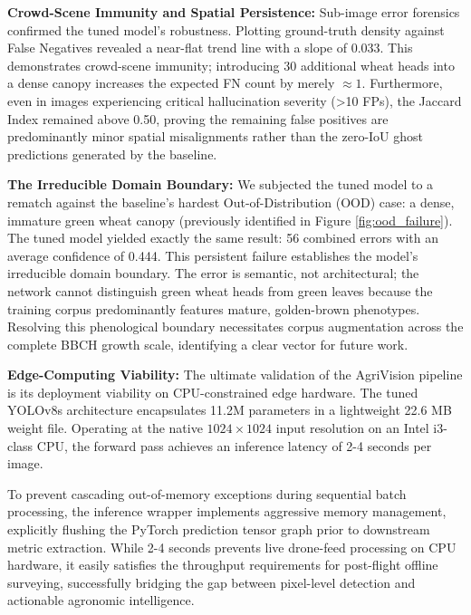 \textbf{Crowd-Scene Immunity and Spatial Persistence:} 
Sub-image error forensics confirmed the tuned model's robustness. Plotting ground-truth density against False Negatives revealed a near-flat trend line with a slope of 0.033. This demonstrates crowd-scene immunity; introducing 30 additional wheat heads into a dense canopy increases the expected FN count by merely $\approx 1$. Furthermore, even in images experiencing critical hallucination severity (>10 FPs), the Jaccard Index remained above 0.50, proving the remaining false positives are predominantly minor spatial misalignments rather than the zero-IoU ghost predictions generated by the baseline. 

\textbf{The Irreducible Domain Boundary:} 
We subjected the tuned model to a rematch against the baseline's hardest Out-of-Distribution (OOD) case: a dense, immature green wheat canopy (previously identified in Figure \ref{fig:ood_failure}). The tuned model yielded exactly the same result: 56 combined errors with an average confidence of 0.444. This persistent failure establishes the model's irreducible domain boundary. The error is semantic, not architectural; the network cannot distinguish green wheat heads from green leaves because the training corpus predominantly features mature, golden-brown phenotypes. Resolving this phenological boundary necessitates corpus augmentation across the complete BBCH growth scale, identifying a clear vector for future work.

\textbf{Edge-Computing Viability:} 
The ultimate validation of the AgriVision pipeline is its deployment viability on CPU-constrained edge hardware. The tuned YOLOv8s architecture encapsulates 11.2M parameters in a lightweight 22.6 MB weight file. Operating at the native $1024 \times 1024$ input resolution on an Intel i3-class CPU, the forward pass achieves an inference latency of 2-4 seconds per image. 

To prevent cascading out-of-memory exceptions during sequential batch processing, the inference wrapper implements aggressive memory management, explicitly flushing the PyTorch prediction tensor graph prior to downstream metric extraction. While 2-4 seconds prevents live drone-feed processing on CPU hardware, it easily satisfies the throughput requirements for post-flight offline surveying, successfully bridging the gap between pixel-level detection and actionable agronomic intelligence.